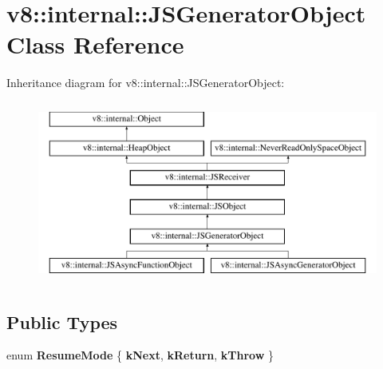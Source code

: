 \hypertarget{classv8_1_1internal_1_1JSGeneratorObject}{}\section{v8\+:\+:internal\+:\+:J\+S\+Generator\+Object Class Reference}
\label{classv8_1_1internal_1_1JSGeneratorObject}
Inheritance diagram for v8\+:\+:internal\+:\+:J\+S\+Generator\+Object\+:\begin{figure}[H]
\begin{center}
\leavevmode
\includegraphics[height=6.000000cm]{classv8_1_1internal_1_1JSGeneratorObject}
\end{center}
\end{figure}
\subsection*{Public Types}
\begin{DoxyCompactItemize}
\item 
\mbox{\label{classv8_1_1internal_1_1JSGeneratorObject_a8a7b5950a31ccfb7e1919c4758863d75}} 
enum {\bfseries Resume\+Mode} \{ {\bfseries k\+Next}, 
{\bfseries k\+Return}, 
{\bfseries k\+Throw}
 \}
\end{DoxyCompactItemize}
